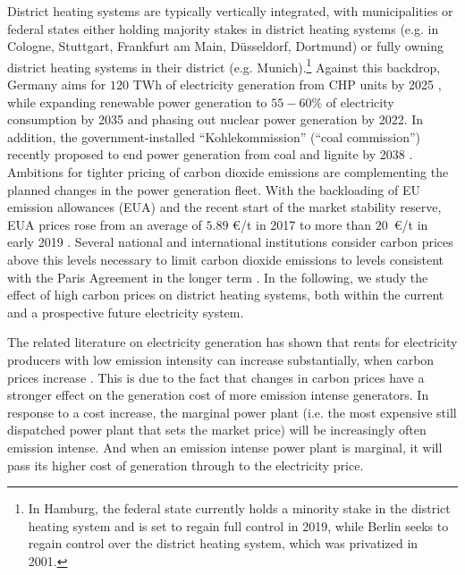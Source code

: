 \documentclass[preprint, 12pt, authoryear]{elsarticle}
\begin{document}
District heating systems are typically vertically integrated, with municipalities or federal states either holding majority stakes in district heating systems (e.g. in Cologne, Stuttgart, Frankfurt am Main, D\"usseldorf, Dortmund) or fully owning district heating systems in their district (e.g. Munich).\footnote{In Hamburg, the federal state currently holds a minority stake in the district heating system and is set to regain full control in 2019, while Berlin seeks to regain control over the district heating system, which was privatized in 2001. }
Against this backdrop, Germany aims for $120$ TWh of electricity generation from CHP units by 2025 \citep{KWKG2016}, while expanding renewable power generation to $55-60 \%$ of electricity consumption by 2035 and phasing out nuclear power generation by 2022. 
In addition, the government-installed “Kohlekommission” (“coal commission”) recently proposed to end power generation from coal and lignite by 2038 \citep{KommissionWSB2019}. 
Ambitions for tighter pricing of carbon dioxide emissions are complementing the planned changes in the power generation fleet.
With the backloading of EU emission allowances (EUA) and the recent start of the market stability reserve, EUA prices rose from an average of $5.89$ \euro{}/t in 2017 to more than $20$~\euro{}/t in early 2019 \citep{EEX2019}.
Several national and international institutions consider carbon prices above this levels necessary to limit carbon dioxide emissions to levels consistent with the Paris Agreement \citep{UNFCCC2015} in the longer term \citep[e.g.][]{Parry2018, OECD2018}. 
In the following, we study the effect of high carbon prices on district heating systems, both within the current and a prospective future electricity system. 

The related literature on electricity generation has shown that rents for electricity producers with low  emission intensity can increase substantially, when carbon  prices increase \citep{Sijm2006, Jouvet2013}. 
This is due to the fact that changes in carbon prices have a stronger effect on the generation cost of more emission intense generators. 
In response to a cost increase, the marginal power plant (i.e. the most expensive still dispatched power plant that sets the market price) will be increasingly often emission intense. And when an emission intense power plant is marginal, it will pass its higher cost of generation through to the electricity price.
\end{document}
